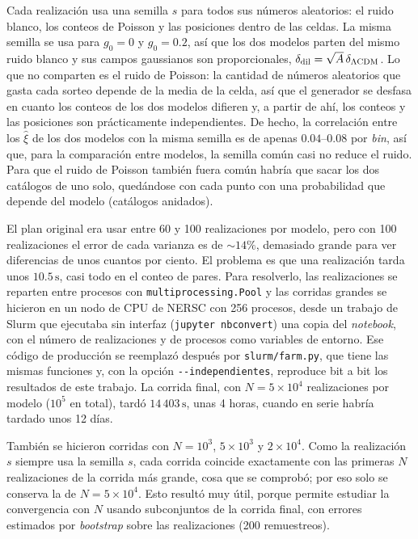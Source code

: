 \documentclass[letterpaper, 12pt]{article}
\newcommand{\LCDM}{\Lambda\mathrm{CDM}}
\begin{document}
            Cada realización usa una semilla $s$ para todos sus números aleatorios: el ruido blanco, los conteos de Poisson y las posiciones dentro de las celdas. La misma semilla se usa para $g_0 = 0$ y $g_0 = 0.2$, así que los dos modelos parten del mismo ruido blanco y sus campos gaussianos son proporcionales, $\delta_{\rm dil} = \sqrt{A}\,\delta_{\LCDM}$. Lo que no comparten es el ruido de Poisson: la cantidad de números aleatorios que gasta cada sorteo depende de la media de la celda, así que el generador se desfasa en cuanto los conteos de los dos modelos difieren y, a partir de ahí, los conteos y las posiciones son prácticamente independientes. De hecho, la correlación entre los $\hat\xi$ de los dos modelos con la misma semilla es de apenas $0.04$--$0.08$ por \emph{bin}, así que, para la comparación entre modelos, la semilla común casi no reduce el ruido. Para que el ruido de Poisson también fuera común habría que sacar los dos catálogos de uno solo, quedándose con cada punto con una probabilidad que depende del modelo (catálogos anidados).

            El plan original era usar entre 60 y 100 realizaciones por modelo, pero con 100 realizaciones el error de cada varianza es de ${\sim}14\%$, demasiado grande para ver diferencias de unos cuantos por ciento. El problema es que una realización tarda unos $10.5\,\mathrm{s}$, casi todo en el conteo de pares. Para resolverlo, las realizaciones se reparten entre procesos con \texttt{multiprocessing.Pool} y las corridas grandes se hicieron en un nodo de CPU de NERSC con 256 procesos, desde un trabajo de Slurm que ejecutaba sin interfaz (\texttt{jupyter nbconvert}) una copia del \emph{notebook}, con el número de realizaciones y de procesos como variables de entorno. Ese código de producción se reemplazó después por \texttt{slurm/farm.py}, que tiene las mismas funciones y, con la opción \texttt{-{}-independientes}, reproduce bit a bit los resultados de este trabajo. La corrida final, con $N = 5\times10^4$ realizaciones por modelo ($10^5$ en total), tardó $14\,403\,\mathrm{s}$, unas 4 horas, cuando en serie habría tardado unos 12 días.

            También se hicieron corridas con $N = 10^3$, $5\times10^3$ y $2\times10^4$. Como la realización $s$ siempre usa la semilla $s$, cada corrida coincide exactamente con las primeras $N$ realizaciones de la corrida más grande, cosa que se comprobó; por eso solo se conserva la de $N = 5\times10^4$. Esto resultó muy útil, porque permite estudiar la convergencia con $N$ usando subconjuntos de la corrida final, con errores estimados por \emph{bootstrap} sobre las realizaciones (200 remuestreos).
\end{document}
